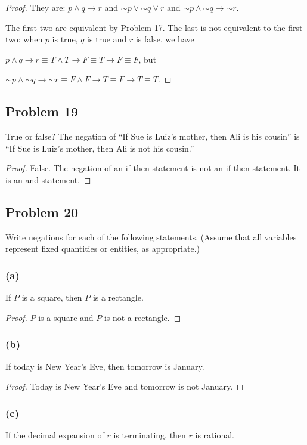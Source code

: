 \documentclass[14pt]{extarticle}
\begin{document}
\begin{proof}
They are: $p \wedge q \to r$ and ${\sim p} \vee {\sim q} \vee r$ and ${\sim p} \wedge {\sim q} \to {\sim r}$.

The first two are equivalent by Problem 17. The last is not equivalent to the first two: when $p$ is true, $q$ is true and $r$ is false, we have 

$p \wedge q \to r \equiv T \wedge T \to F \equiv T \to F \equiv F$, but 

${\sim p} \wedge {\sim q} \to {\sim r} \equiv F \wedge F \to T \equiv F \to T \equiv T$.
\end{proof}

\subsection{Problem 19}
True or false? The negation of “If Sue is Luiz’s mother, then Ali is his cousin” is “If Sue is Luiz’s mother, then Ali is not his cousin.”

\begin{proof}
False. The negation of an if-then statement is not an if-then statement. It is an and statement.
\end{proof}

\subsection{Problem 20}
Write negations for each of the following statements. (Assume that all variables represent fixed quantities or entities, as appropriate.)

\subsubsection{(a)}
If $P$ is a square, then $P$ is a rectangle.

\begin{proof}
$P$ is a square and $P$ is not a rectangle.
\end{proof}

\subsubsection{(b)}
If today is New Year’s Eve, then tomorrow is January.

\begin{proof}
Today is New Year’s Eve and tomorrow is not January.
\end{proof}

\subsubsection{(c)}
If the decimal expansion of $r$ is terminating, then $r$ is rational.
\end{document}
